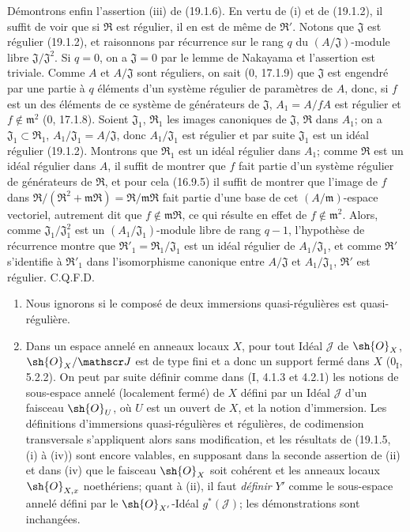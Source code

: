 Démontrons enfin l'assertion (iii) de (19.1.6). En vertu de (i) et de (19.1.2), il suffit de voir que si $\mathfrak R$ est régulier, il en est de même de $\mathfrak R'$. Notons que $\mathfrak J$ est régulier (19.1.2), et raisonnons par récurrence sur le rang $q$ du $(A/\mathfrak J)$-module libre $\mathfrak J/\mathfrak J^2$. Si $q=0$, on a $\mathfrak J=0$ par le lemme de Nakayama et l'assertion est triviale. Comme $A$ et $A/\mathfrak J$ sont réguliers, on sait ($0$, 17.1.9) que $\mathfrak J$ est engendré par une partie à $q$ éléments d'un système régulier de paramètres de $A$, donc, si $f$ est un des éléments de ce système de générateurs de $\mathfrak J$, $A_1=A/fA$ est régulier et $f\notin\mathfrak m^2$ ($0$, 17.1.8). Soient $\mathfrak J_1$, $\mathfrak R_1$ les images canoniques de $\mathfrak J$, $\mathfrak R$ dans $A_1$; on a $\mathfrak J_1\subset\mathfrak R_1$, $A_1/\mathfrak J_1=A/\mathfrak J$, donc $A_1/\mathfrak J_1$ est régulier et par suite $\mathfrak J_1$ est un idéal régulier (19.1.2). Montrons que $\mathfrak R_1$ est un idéal régulier dans $A_1$; comme $\mathfrak R$ est un idéal régulier dans $A$, il suffit de montrer que $f$ fait partie d'un système régulier de générateurs de $\mathfrak R$, et pour cela (16.9.5) il suffit de montrer que l'image de $f$ dans $\mathfrak R/(\mathfrak R^2+\mathfrak m\mathfrak R)=\mathfrak R/\mathfrak m\mathfrak R$ fait partie d'une base de cet $(A/\mathfrak m)$-espace vectoriel, autrement dit que $f\notin\mathfrak m\mathfrak R$, ce qui résulte en effet de $f\notin\mathfrak m^2$. Alors, comme $\mathfrak J_1/\mathfrak J_1^2$ est un $(A_1/\mathfrak J_1)$-module libre de rang $q-1$, l'hypothèse de récurrence montre que $\mathfrak R'_1=\mathfrak R_1/\mathfrak J_1$ est un idéal régulier de $A_1/\mathfrak J_1$, et comme $\mathfrak R'$ s'identifie à $\mathfrak R'_1$ dans l'isomorphisme canonique entre $A/\mathfrak J$ et $A_1/\mathfrak J_1$, $\mathfrak R'$ est régulier. C.Q.F.D.

\begin{remarks}[19.1.7]
\label{IV.19.1.7}
\begin{enumerate}
  \item[(i)] Nous ignorons si le composé de deux immersions quasi-régulières est quasi-régulière.
  \item[(ii)] Dans un espace annelé en anneaux locaux $X$, pour tout Idéal $\mathscr J$ de $\sh{O}_X$, $\sh{O}_X/\mathscr J$ est de type fini et a donc un support fermé dans $X$ ($0_{\mathrm I}$, 5.2.2). On peut par suite définir comme dans (I, 4.1.3 et 4.2.1) les notions de sous-espace annelé (localement fermé) de $X$ défini par un Idéal $\mathscr J$ d'un faisceau $\sh{O}_U$, où $U$ est un ouvert de $X$, et la notion d'immersion. Les définitions d'immersions quasi-régulières et régulières, de codimension transversale s'appliquent alors sans modification, et les résultats de (19.1.5, (i) à (iv)) sont encore valables, en supposant dans la seconde assertion de (ii) et dans (iv) que le faisceau $\sh{O}_X$ soit cohérent et les anneaux locaux $\sh{O}_{X,x}$ noethériens; quant à (ii), il faut \emph{définir} $Y'$ comme le sous-espace annelé défini par le $\sh{O}_{X'}$-Idéal $g^*(\mathscr J)$; les démonstrations sont inchangées.
\end{enumerate}
\end{remarks}

